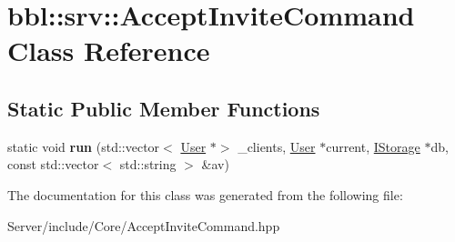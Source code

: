 \hypertarget{classbbl_1_1srv_1_1_accept_invite_command}{}\section{bbl\+:\+:srv\+:\+:Accept\+Invite\+Command Class Reference}
\label{classbbl_1_1srv_1_1_accept_invite_command}
\subsection*{Static Public Member Functions}
\begin{DoxyCompactItemize}
\item 
\mbox{\label{classbbl_1_1srv_1_1_accept_invite_command_a1e5fb4cd5d990f02afc275c6d1373b3f}} 
static void {\bfseries run} (std\+::vector$<$ \hyperlink{classbbl_1_1srv_1_1_user}{User} $\ast$$>$ \+\_\+clients, \hyperlink{classbbl_1_1srv_1_1_user}{User} $\ast$current, \hyperlink{classbbl_1_1srv_1_1_i_storage}{I\+Storage} $\ast$db, const std\+::vector$<$ std\+::string $>$ \&av)
\end{DoxyCompactItemize}


The documentation for this class was generated from the following file\+:\begin{DoxyCompactItemize}
\item 
Server/include/\+Core/Accept\+Invite\+Command.\+hpp\end{DoxyCompactItemize}
